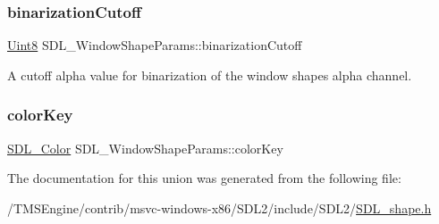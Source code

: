 \subsubsection{\texorpdfstring{binarization\+Cutoff}{binarizationCutoff}}
{\footnotesize\ttfamily \hyperlink{_s_d_l__stdinc_8h_a2944638813a090aa23e62f4da842c3e2}{Uint8} S\+D\+L\+\_\+\+Window\+Shape\+Params\+::binarization\+Cutoff}



A cutoff alpha value for binarization of the window shape\textquotesingle{}s alpha channel. 

\mbox{\label{union_s_d_l___window_shape_params_a8bf3e442a51a1bbf452cfec7c1ed5318}} 
\subsubsection{\texorpdfstring{color\+Key}{colorKey}}
{\footnotesize\ttfamily \hyperlink{struct_s_d_l___color}{S\+D\+L\+\_\+\+Color} S\+D\+L\+\_\+\+Window\+Shape\+Params\+::color\+Key}



The documentation for this union was generated from the following file\+:\begin{DoxyCompactItemize}
\item 
/\+T\+M\+S\+Engine/contrib/msvc-\/windows-\/x86/\+S\+D\+L2/include/\+S\+D\+L2/\hyperlink{_s_d_l__shape_8h}{S\+D\+L\+\_\+shape.\+h}\end{DoxyCompactItemize}
